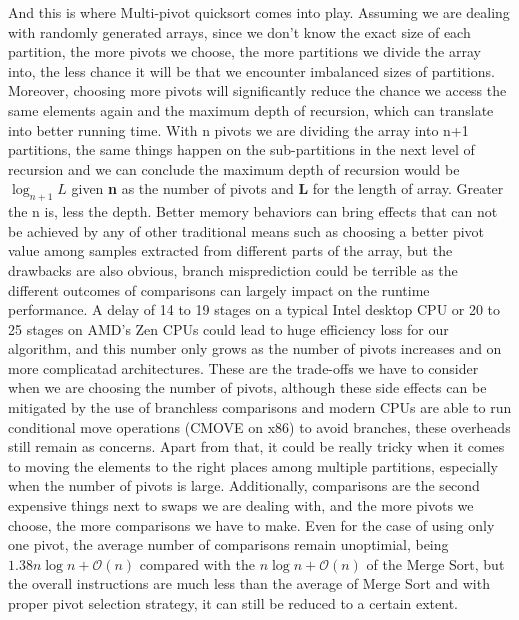 \documentclass{article}
\newcommand{\bigO}{\mathcal{O}}
\begin{document}
And this is where Multi-pivot quicksort comes into play. Assuming we are dealing with randomly generated arrays,
since we don't know the exact size of each partition, the more pivots we choose, the more partitions we divide the array into,
the less chance it will be that we encounter imbalanced sizes of partitions. 
Moreover, choosing more pivots will significantly reduce the chance we access the same elements again and the maximum depth of recursion,
which can translate into better running time. With n pivots we are dividing the array into n+1 partitions, the same things happen on the sub-partitions 
in the next level of recursion and we can conclude the maximum depth of recursion would be $\log_{n+1} L$ given \textbf{n} as the number of pivots and \textbf{L} for the length of array.
Greater the n is, less the depth. Better memory behaviors can bring effects that can not be achieved by any of other traditional means such as choosing a better pivot value
among samples extracted from different parts of the array, but the drawbacks are also obvious, 
branch misprediction could be terrible as the different outcomes of comparisons can largely impact on the runtime performance.
A delay of 14 to 19 stages on a typical Intel desktop CPU or 20 to 25 stages on AMD's Zen CPUs could lead to huge efficiency loss for our algorithm,
and this number only grows as the number of pivots increases and on more complicatad architectures. These are the trade-offs we have to consider when we are choosing the number of pivots,
although these side effects can be mitigated by the use of branchless comparisons and modern CPUs are able to run conditional move operations (CMOVE on x86) to avoid branches,
these overheads still remain as concerns.
Apart from that, it could be really tricky when it comes to moving the elements to the right places among multiple partitions, especially when the number of pivots is large.
Additionally, comparisons are the second expensive things next to swaps we are dealing with, and the more pivots we choose, the more comparisons we have to make.
Even for the case of using only one pivot, the average number of comparisons remain unoptimial, being $1.38n\log n + \bigO(n)$ compared with the $n\log n + \bigO(n)$ of the Merge Sort,
but the overall instructions are much less than the average of Merge Sort and with proper pivot selection strategy, it can still be reduced to a certain extent.

\end{document}
